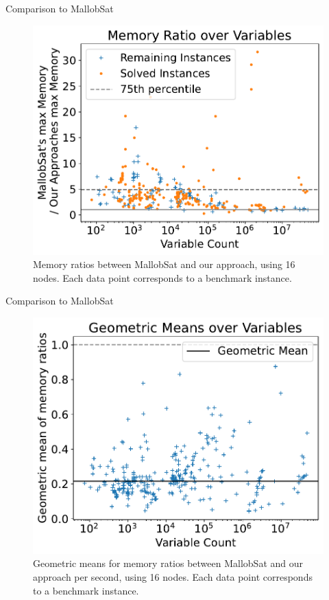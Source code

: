 \documentclass{beamer}
\begin{document}
\begin{frame}{Comparison to MallobSat}
    \center
    \begin{figure}[c]{}
      \center
      \includegraphics[scale=.45]{plots/16node_compare/mem_ratio_over_vars.pdf}
      \caption{Memory ratios between MallobSat and our approach, using 16 nodes. Each data point corresponds to a benchmark instance.}
    \end{figure}
\end{frame}

\begin{frame}{Comparison to MallobSat}
    \center
    \begin{figure}[c]{}
      \center
      \includegraphics[scale=.425]{plots/16node_compare/mem_gm_over_vars.pdf}
      \caption{Geometric means for memory ratios between MallobSat and our approach per second, using 16 nodes. Each data point corresponds to a benchmark instance.}
    \end{figure}
\end{frame}
\end{document}
